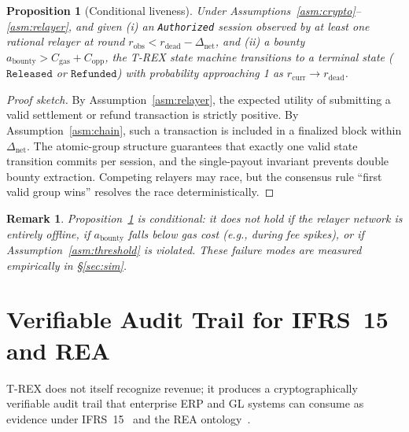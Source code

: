 \documentclass[journal]{IEEEtran}
\newtheorem{proposition}[theorem]{Proposition}
\newtheorem{remark}[theorem]{Remark}
\begin{document}
\begin{proposition}[Conditional liveness]
\label{prop:liveness}
Under Assumptions~\ref{asm:crypto}--\ref{asm:relayer}, and given (i) an \texttt{Authorized} session observed by at least one rational relayer at round $r_{\text{obs}} < r_{\text{dead}} - \Delta_{\text{net}}$, and (ii) a bounty $a_{\text{bounty}} > C_{\text{gas}} + C_{\text{opp}}$, the T-REX state machine transitions to a terminal state ($\texttt{Released}$ or $\texttt{Refunded}$) with probability approaching 1 as $r_{\text{curr}} \to r_{\text{dead}}$.
\end{proposition}

\begin{proof}[Proof sketch]
By Assumption~\ref{asm:relayer}, the expected utility of submitting a valid settlement or refund transaction is strictly positive. By Assumption~\ref{asm:chain}, such a transaction is included in a finalized block within $\Delta_{\text{net}}$. The atomic-group structure guarantees that exactly one valid state transition commits per session, and the single-payout invariant prevents double bounty extraction. Competing relayers may race, but the consensus rule ``first valid group wins'' resolves the race deterministically.
\end{proof}

\begin{remark}
Proposition~\ref{prop:liveness} is conditional: it does not hold if the relayer network is entirely offline, if $a_{\text{bounty}}$ falls below gas cost (e.g., during fee spikes), or if Assumption~\ref{asm:threshold} is violated. These failure modes are measured empirically in \S\ref{sec:sim}.
\end{remark}

\section{Verifiable Audit Trail for IFRS~15 and REA}
\label{sec:accounting}

T-REX does not itself recognize revenue; it produces a cryptographically verifiable audit trail that enterprise ERP and GL systems can consume as evidence under IFRS~15~\cite{ifrs15} and the REA ontology~\cite{mccarthy1982rea}.
\end{document}
